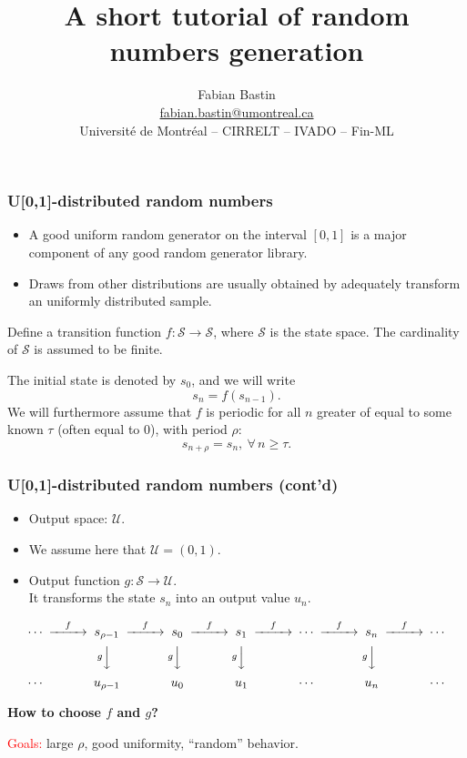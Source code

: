 \documentclass{beamer}
\title[Random Numbers Generation]{A short tutorial of random numbers generation}
\author[Fabian Bastin]{Fabian Bastin \\ \url{fabian.bastin@umontreal.ca} \\ Université de Montréal -- CIRRELT -- IVADO -- Fin-ML}
\date{}
\begin{document}
	
	\frame{\titlepage}
	
	
	\begin{frame}
		\frametitle{U[0,1]-distributed random numbers}
		
		\begin{itemize}
			\item
			A good uniform random generator on the interval $[0,1]$ is a major
			component of any good random generator library.
			\item
			Draws from other distributions are usually obtained by adequately transform an
			uniformly distributed sample.
		\end{itemize}
		
		\mbox{}
		
		Define a {\blue transition function} $f: \mathcal{S} \rightarrow \mathcal{S}$,
		where $\mathcal{S}$ is the {\blue state space}.
		The cardinality of $\mathcal{S}$ is assumed to be finite.
		
		\mbox{}
		
		The initial state is denoted by $s_0$, and we will write
		\[
		s_n = f(s_{n-1}).
		\]
		We will furthermore assume that $f$ is periodic for all $n$ greater of
		equal to some known $\tau$ (often equal to 0), with period $\rho$:
		$$
		s_{n+\rho} = s_n,\ \forall\, n\ge\tau.
		$$
		
	\end{frame}
	
	\begin{frame}
		\frametitle{U[0,1]-distributed random numbers (cont'd)}
		
		\begin{itemize}
			\item
			Output space: $\mathcal{U}$.
			\item
			We assume here that $\mathcal{U} = (0,1)$.
			\item
			Output function $g: \mathcal{S} \rightarrow \mathcal{U}$.\\
			It transforms the state $s_n$ into an output value $u_n$.
		\end{itemize}
		
		\begin{small}
			\[
			\begin{CD}
				\cdots @>f>> s_{\rho-1} @>f>> s_0 @>f>> s_1  @>f>> 
				\cdots @>f>> s_n @>f>> \cdots \\ 
				@. @V{g}VV  @V{g}VV   @V{g}VV   
				@.  @V{g}VV  \\
				\cdots @. u_{\rho-1} @. u_0
				@.  u_1  @.   \cdots @.  u_n @.  \cdots \\
			\end{CD}
			\]
			\label{fig:rng}
		\end{small}
		
		\mbox{}
		
		{\bf How to choose $f$ and $g$?}
		
		\mbox{}
		
		\textcolor{red}{Goals:} large $\rho$, good uniformity, ``random'' behavior.
		
	\end{frame}
	
\end{document}
